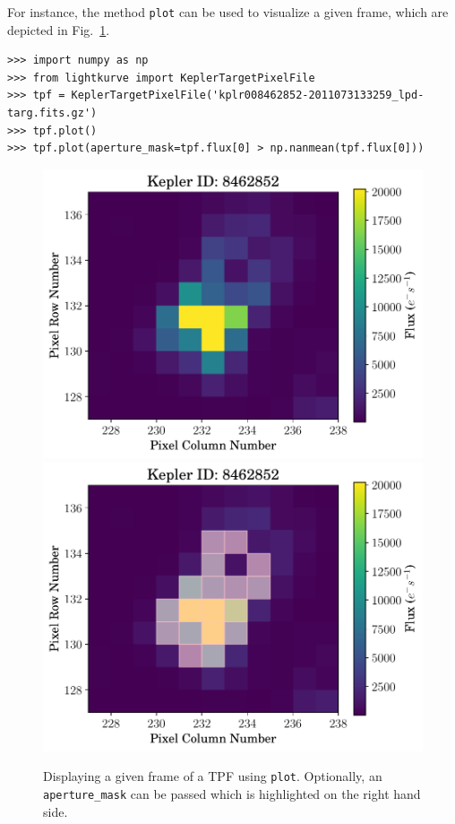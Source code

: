\documentclass{article}
\begin{document}
        For instance, the method \texttt{plot} can be used to visualize a
        given frame, which are depicted in Fig.~\ref{fig:plot-method}.
\begin{verbatim}
>>> import numpy as np
>>> from lightkurve import KeplerTargetPixelFile
>>> tpf = KeplerTargetPixelFile('kplr008462852-2011073133259_lpd-targ.fits.gz')
>>> tpf.plot()
>>> tpf.plot(aperture_mask=tpf.flux[0] > np.nanmean(tpf.flux[0]))
\end{verbatim}

\begin{figure}[!htb]
    \centering
    \includegraphics[scale=.4]{figs/tpf-plot.pdf}
    \includegraphics[scale=.4]{figs/tpf-plot-aperture.pdf}
    \caption{Displaying a given frame of a TPF using \texttt{plot}.
    Optionally, an \texttt{aperture\_mask} can be passed which is
    highlighted on the right hand side.}
    \label{fig:plot-method}
\end{figure}
\end{document}
